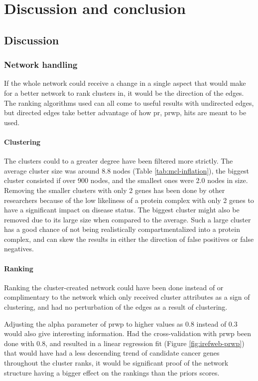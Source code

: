 \part{Discussion and conclusion}
\label{pa:conclusion}
\chapter{Discussion}
\section{Network handling}
If the whole network could receive a change in a single aspect that would make
for a better network to rank clusters in, it would be the direction of the
edges. The ranking algorithms used can all come to useful results with
undirected edges, but directed edges take better advantage of how \gls{pr},
\gls{prwp}, \gls{hits} are meant to be used.

\subsection{Clustering}
The clusters could to a greater degree have been filtered more strictly. The
average cluster size was around 8.8 nodes (Table \ref{tab:mcl-inflation}), the
biggest cluster consisted if over 900 nodes, and the smallest ones were 2.0 
nodes in size. Removing the smaller clusters with only 2 genes has been done by
other researchers because of the low likeliness of a protein complex with only
2 genes to have a significant impact on disease status. The biggest cluster
might also be removed due to its large size when compared to the average. Such
a large cluster has a good chance of not being realistically compartmentalized
into a protein complex, and can skew the results in either the direction of
false positives or false negatives.

\subsection{Ranking}
Ranking the cluster-created network could have been done instead of or
complimentary to the network which only received cluster attributes as a sign
of clustering, and had no perturbation of the edges as a result of clustering.

Adjusting the alpha parameter of \gls{prwp} to higher values as 0.8 instead of 0.3 would also
give interesting information. Had the cross-validation with \gls{prwp} 
been done with 0.8, and resulted in a linear regression fit
(Figure \ref{fig:irefweb-prwp}) that would have had a less descending trend of
candidate cancer genes throughout the cluster ranks, it would be significant
proof of the network structure having a bigger effect on the rankings than the
priors scores.

